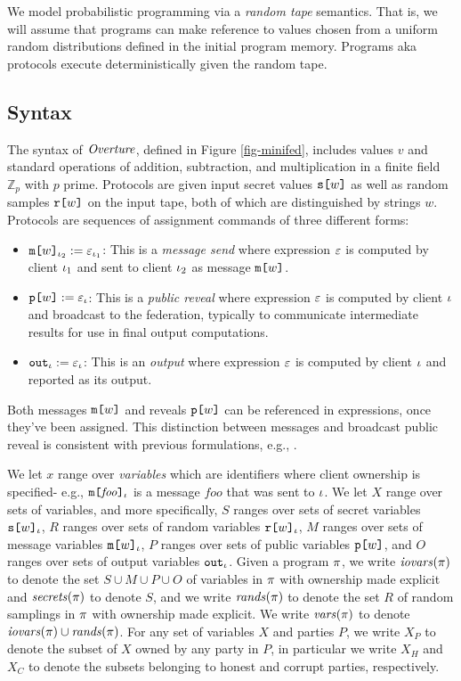 We model probabilistic programming via a \emph{random tape}
semantics. That is, we will assume that programs can make reference to
values chosen from a uniform random distributions defined in the
initial program memory.  Programs aka protocols execute
deterministically given the random tape.

\subsection{Syntax} The syntax of $\mathit{Overture}$, defined in
Figure \ref{fig-minifed}, includes values $v$ and standard
operations of addition, subtraction, and multiplication in
a finite field $\mathbb{Z}_p$ with $p$ prime. 
Protocols are given input secret values $\texttt{s[}w\texttt{]}$
as well as random samples $\texttt{r[}w\texttt{]}$ on the input
tape, both of which are distinguished by
strings $w$. Protocols are sequences of assignment
commands of three different forms:
\begin{itemize}
\item $\texttt{m[}w\texttt{]}_{\iota_2} := \varepsilon_{\iota_1}$: This
  is a \emph{message send} where expression $\varepsilon$ is computed
  by client $\iota_1$ and sent to client $\iota_2$ as message
  $\texttt{m[}w\texttt{]}$.
\item $\texttt{p[}w\texttt{]} := \varepsilon_{\iota}$: This
  is a \emph{public reveal} where expression $\varepsilon$ is computed
  by client $\iota$ and broadcast to the federation, typically
  to communicate intermediate results for use in final output
  computations.
\item $\texttt{out}_{\iota} := \varepsilon_{\iota}$: This
  is an \emph{output} where expression $\varepsilon$ is computed
  by client $\iota$ and reported as its output.
\end{itemize}
Both messages $\texttt{m[}w\texttt{]}$ and reveals $\texttt{p[}w\texttt{]}$ can be
referenced in expressions, once they've been assigned.
This distinction between messages and broadcast public
reveal is consistent with previous formulations, e.g.,
\cite{6266151}.

We let $x$ range over \emph{variables} which are identifiers where
client ownership is specified- e.g.,
$\texttt{m[}\mathit{foo}\texttt{]}_{\iota}$ is a message $\mathit{foo}$ that
was sent to $\iota$. We let $X$ range over sets of variables, and more
specifically, $S$ ranges over sets of secret variables
$\texttt{s[}w\texttt{]}_{\iota}$, $R$ ranges over sets of random variables
$\texttt{r[}w\texttt{]}_{\iota}$, $M$ ranges over sets of message variables
$\texttt{m[}w\texttt{]}_{\iota}$, $P$ ranges over sets of public variables
$\texttt{p[}w\texttt{]}$, and $O$ ranges over sets of output variables $\texttt{out}_{\iota}$.
Given a program $\pi$, we write $\mathit{iovars}(\pi)$ to denote the set $S
\cup M \cup P \cup O$ of variables in $\pi$ with ownership made
explicit and $\mathit{secrets}(\pi)$ to denote $S$, and we write
$\mathit{rands}(\pi)$ to denote the set $R$ of random samplings in $\pi$
with ownership made explicit. We write $\mathit{vars}(\pi)$ to denote
$\mathit{iovars}(\pi) \cup \mathit{rands}(\pi)$. For any set of variables $X$ and
parties $P$, we write $X_P$ to denote the subset of $X$ owned by any
party in $P$, in particular we write $X_H$ and $X_C$ to denote the
subsets belonging to honest and corrupt parties, respectively.

